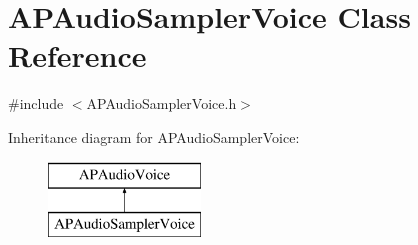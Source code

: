 \hypertarget{class_a_p_audio_sampler_voice}{\section{A\+P\+Audio\+Sampler\+Voice Class Reference}
\label{class_a_p_audio_sampler_voice}
}


{\ttfamily \#include $<$A\+P\+Audio\+Sampler\+Voice.\+h$>$}

Inheritance diagram for A\+P\+Audio\+Sampler\+Voice\+:\begin{figure}[H]
\begin{center}
\leavevmode
\includegraphics[height=2.000000cm]{class_a_p_audio_sampler_voice}
\end{center}
\end{figure}
